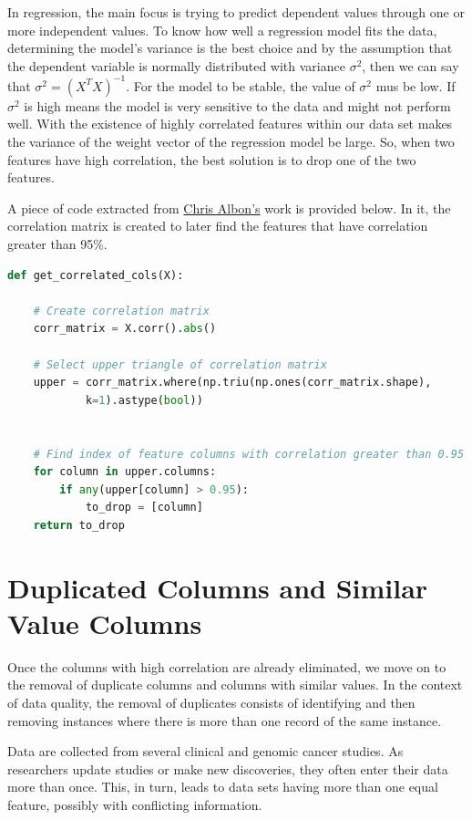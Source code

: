 In regression, the main focus is trying to predict dependent values through one or more independent values. To know how well a regression model fits the data, determining the model's variance is the best choice and by the assumption that the dependent variable is normally distributed with variance \(\sigma^2\), then we can say that \(\sigma^2 = (X^TX)^{-1}\). For the model to be stable, the value of \(\sigma^2\) mus be low. If \(\sigma^2\) is high means the model is very sensitive to the data and might not perform well. With the existence of highly correlated features within our data set makes the variance of the weight vector of the regression model be large. So, when two features have high correlation, the best solution is to drop one of the two features.

A piece of code extracted from \href{https://chrisalbon.com/code/machine_learning/feature_selection/drop_highly_correlated_features/}{Chris Albon’s} work is provided below. In it, the correlation matrix is created to later find the features that have correlation greater than 95\%.

\begin{lstlisting}[language=Python]
def get_correlated_cols(X):

    # Create correlation matrix
    corr_matrix = X.corr().abs()

    # Select upper triangle of correlation matrix
    upper = corr_matrix.where(np.triu(np.ones(corr_matrix.shape),
            k=1).astype(bool))
           
           
    # Find index of feature columns with correlation greater than 0.95
    for column in upper.columns:
        if any(upper[column] > 0.95):
            to_drop = [column]
    return to_drop
\end{lstlisting}


\section{Duplicated Columns and Similar Value Columns}
\label{sec:duplicated_similar_columns}
\hspace{10px}Once the columns with high correlation are already eliminated, we move on to the removal of duplicate columns and columns with similar values. In the context of data quality, the removal of duplicates consists of identifying and then removing instances where there is more than one record of the same instance.

Data are collected from several clinical and genomic cancer studies. As researchers update studies or make new discoveries, they often enter their data more than once. This, in turn, leads to data sets having more than one equal feature, possibly with conflicting information.

